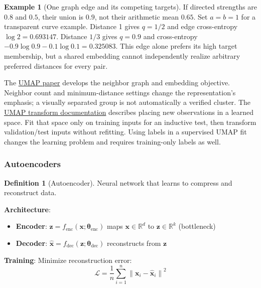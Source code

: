 \documentclass[11pt,twoside]{article}
\numberwithin{equation}{section}
\newcommand{\R}{\mathbb{R}}
\newcommand{\vect}[1]{\bm{#1}}
\newcommand{\norm}[1]{\left\lVert#1\right\rVert}
\newcommand{\Loss}{\mathcal{L}}
\theoremstyle{plain}
\theoremstyle{definition}
\newtheorem{definition}[theorem]{Definition}
\newtheorem{example}[theorem]{Example}
\theoremstyle{remark}
\begin{document}
\begin{example}[One graph edge and its competing targets]
If directed strengths are $0.8$ and $0.5$, their union is $0.9$, not their arithmetic mean $0.65$. Set $a=b=1$ for a transparent curve example. Distance 1 gives $q=1/2$ and edge cross-entropy $\log2=0.693147$. Distance $1/3$ gives $q=0.9$ and cross-entropy $-0.9\log0.9-0.1\log0.1=0.325083$. This edge alone prefers its high target membership, but a shared embedding cannot independently realize arbitrary preferred distances for every pair.
\end{example}
The \href{https://arxiv.org/abs/1802.03426}{UMAP paper} develops the neighbor graph and embedding objective. Neighbor count and minimum-distance settings change the representation's emphasis; a visually separated group is not automatically a verified cluster. The \href{https://umap-learn.readthedocs.io/en/latest/transform.html}{UMAP transform documentation} describes placing new observations in a learned space. Fit that space only on training inputs for an inductive test, then transform validation/test inputs without refitting. Using labels in a supervised UMAP fit changes the learning problem and requires training-only labels as well.

\subsubsection{Autoencoders}
\label{sec:autoencoder-basics}

\begin{definition}[Autoencoder]
Neural network that learns to compress and reconstruct data.

\textbf{Architecture}:
\begin{itemize}
\item \textbf{Encoder}: $\vect{z} = f_{\text{enc}}(\vect{x}; \vect{\theta}_{\text{enc}})$ maps $\vect{x} \in \R^d$ to $\vect{z} \in \R^k$ (bottleneck)
\item \textbf{Decoder}: $\hat{\vect{x}} = f_{\text{dec}}(\vect{z}; \vect{\theta}_{\text{dec}})$ reconstructs from $\vect{z}$
\end{itemize}

\textbf{Training}: Minimize reconstruction error:
\[
\Loss = \frac1n\sum_{i=1}^n \norm{\vect{x}_i - \hat{\vect{x}}_i}^2
\]
\end{definition}
\end{document}
